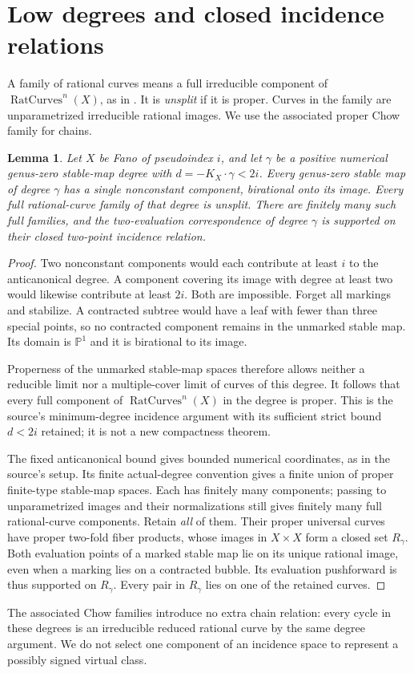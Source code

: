 \documentclass[11pt]{article}
\newtheorem{lemma}[theorem]{Lemma}
\theoremstyle{definition}\newtheorem{definition}[theorem]{Definition}
\theoremstyle{remark}\newtheorem{remark}[theorem]{Remark}
\newcommand{\PP}{\mathbb P}
\newcommand{\Rat}{\operatorname{RatCurves}^{n}}
\begin{document}
\section{Low degrees and closed incidence relations}\label{sec:low}
A family of rational curves means a full irreducible component of $\Rat(X)$,
as in \cite[Definition 2.1]{fujita}. It is \emph{unsplit} if it is proper.
Curves in the family are unparametrized irreducible rational images. We use
the associated proper Chow family for chains.

\begin{lemma}\label{lem:low}
Let $X$ be Fano of pseudoindex $i$, and let $\gamma$ be a positive numerical
genus-zero stable-map degree with $d=-K_X\cdot\gamma<2i$. Every genus-zero stable map of degree
$\gamma$ has a single nonconstant component, birational onto its image.
Every full rational-curve family of that degree is unsplit. There are
finitely many such full families, and the two-evaluation correspondence of
degree $\gamma$ is supported on their closed two-point incidence relation.
\end{lemma}
\begin{proof}
Two nonconstant components would each contribute at least $i$ to the
anticanonical degree. A component covering its image with degree at least
two would likewise contribute at least $2i$. Both are impossible. Forget
all markings and stabilize. A contracted subtree would have a leaf with
fewer than three special points, so no contracted component remains in the
unmarked stable map. Its domain is $\PP^1$ and it is birational to its image.

Properness of the unmarked stable-map spaces therefore allows neither a
reducible limit nor a multiple-cover limit of curves of this degree. It
follows that every full component of $\Rat(X)$ in the degree is proper.
This is the source's minimum-degree incidence argument with its sufficient
strict bound $d<2i$ retained; it is not a new compactness theorem.

The fixed anticanonical bound gives bounded numerical coordinates, as in the
source's setup. Its finite actual-degree convention gives a finite union
of proper finite-type stable-map spaces. Each has finitely many components;
passing to unparametrized images and their normalizations still gives
finitely many full rational-curve components. Retain \emph{all} of them.
Their proper universal curves have proper two-fold fiber products, whose
images in $X\times X$ form a closed set $R_\gamma$. Both evaluation points
of a marked stable map lie on its unique rational image, even when a marking
lies on a contracted bubble. Its evaluation pushforward is thus supported
on $R_\gamma$. Every pair in $R_\gamma$ lies on one of the retained curves.
\end{proof}
The associated Chow families introduce no extra chain relation: every
cycle in these degrees is an irreducible reduced rational curve by the same
degree argument. We do not select one component of an incidence space to
represent a possibly signed virtual class.
\end{document}
